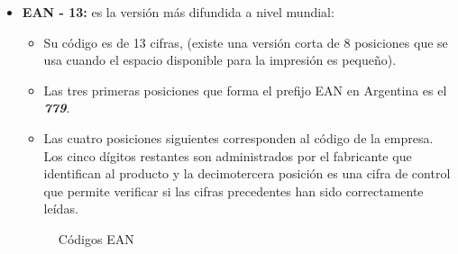 \documentclass[twoside]{article}
\begin{document}
\begin{itemize}
    \item \textbf{EAN - 13:} es la versión más difundida a nivel mundial:
    \begin{itemize}
        \item Su código es de 13 cifras, (existe una versión corta de 8 posiciones que se usa cuando el espacio disponible para la impresión es pequeño).
        \item Las tres primeras posiciones que forma el prefijo EAN en Argentina es el \textbf{\textit{779}}.
        \item Las cuatro posiciones siguientes corresponden al código de la empresa. Los cinco dígitos restantes son administrados por el fabricante que identifican al producto y la decimotercera posición es una cifra de control que permite verificar si las cifras precedentes han sido correctamente leídas.\cite{dynamsoftComprehensiveGuide}
    \end{itemize}

\begin{figure}[H]
  \begin{center}
    \caption{Códigos EAN}
    \label{Figuras-Codigos}
  \end{center}
\end{figure}
\end{itemize}
\end{document}

